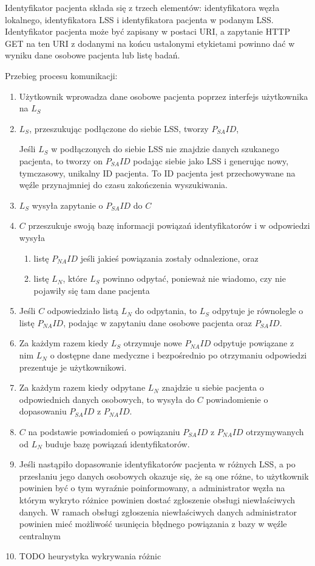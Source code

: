 \documentclass[a4paper]{report}
\begin{document}
Identyfikator pacjenta składa się z trzech elementów: identyfikatora węzła lokalnego, identyfikatora LSS i identyfikatora
pacjenta w podanym LSS. Identyfikator pacjenta może być zapisany w postaci URI, a zapytanie HTTP GET na
ten URI z dodanymi na końcu ustalonymi etykietami powinno dać w wyniku dane osobowe pacjenta lub listę badań.
  
Przebieg procesu komunikacji:
\begin{enumerate}
  \item Użytkownik wprowadza dane osobowe pacjenta poprzez interfejs użytkownika na $L_S$
  \item $L_S$, przeszukując podłączone do siebie LSS, tworzy $P_{SA}ID$,

  Jeśli $L_S$ w podłączonych do siebie LSS nie znajdzie danych szukanego pacjenta, to tworzy on $P_{SA}ID$ podając siebie jako LSS i generując nowy, tymczasowy, unikalny ID pacjenta. To ID pacjenta jest przechowywane na węźle przynajmniej do czasu zakończenia wyszukiwania.
  
  \item $L_S$ wysyła zapytanie o $P_{SA}ID$ do $C$
  \item $C$ przeszukuje swoją bazę informacji powiązań identyfikatorów i w odpowiedzi wysyła
    \begin{enumerate}
      \item listę $P_{NA}ID$ jeśli jakieś powiązania zostały odnalezione, oraz
      \item listę $L_N$, które $L_S$ powinno odpytać, ponieważ nie wiadomo, czy nie pojawiły się tam dane pacjenta
    \end{enumerate}
  \item Jeśli $C$ odpowiedziało listą $L_N$ do odpytania, to $L_S$ odpytuje je równolegle o listę $P_{NA}ID$,
  podając w zapytaniu dane osobowe pacjenta oraz $P_{SA}ID$.
  \item Za każdym razem kiedy $L_S$ otrzymuje nowe $P_{NA}ID$ odpytuje powiązane z nim $L_N$ o dostępne dane medyczne i bezpośrednio
  po otrzymaniu odpowiedzi prezentuje je użytkownikowi.
  \item Za każdym razem kiedy odpytane $L_N$ znajdzie u siebie pacjenta o odpowiednich danych osobowych, to wysyła do $C$ powiadomienie
  o dopasowaniu $P_{SA}ID$ z $P_{NA}ID$.
  \item $C$ na podstawie powiadomień o powiązaniu $P_{SA}ID$ z $P_{NA}ID$ otrzymywanych od $L_N$ buduje bazę powiązań identyfikatorów.
  \item Jeśli nastąpiło dopasowanie identyfikatorów pacjenta w różnych LSS, a po przesłaniu jego danych osobowych okazuje się, że są one różne, to użytkownik powinien być o tym wyraźnie poinformowany, a administrator węzła na którym wykryto różnice powinien dostać zgłoszenie obsługi niewłaściwych danych. W ramach obsługi zgłoszenia niewłaściwych danych administrator powinien mieć możliwość usunięcia błędnego powiązania z bazy w węźle centralnym
  \item TODO heurystyka wykrywania różnic

\end{enumerate}
\end{document}
